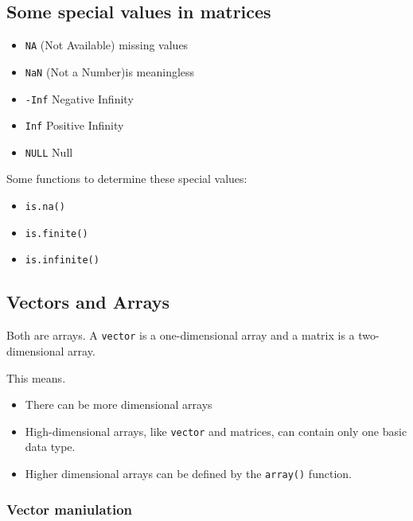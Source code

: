 \documentclass[
]{article}
\begin{document}
\hypertarget{some-special-values-in-matrices}{%
\subsection{Some special values in
matrices}\label{some-special-values-in-matrices}}

\begin{itemize}
\item
  \texttt{NA} (Not Available) missing values
\item
  \texttt{NaN} (Not a Number)is meaningless
\item
  \texttt{-Inf} Negative Infinity
\item
  \texttt{Inf} Positive Infinity
\item
  \texttt{NULL} Null
\end{itemize}

Some functions to determine these special values:

\begin{itemize}
\item
  \texttt{is.na()}
\item
  \texttt{is.finite()}
\item
  \texttt{is.infinite()}
\end{itemize}

\hypertarget{vectors-and-arrays}{%
\subsection{Vectors and Arrays}\label{vectors-and-arrays}}

Both are arrays. A \texttt{vector} is a one-dimensional array and a
matrix is a two-dimensional array.

This means.

\begin{itemize}
\item
  There can be more dimensional arrays
\item
  High-dimensional arrays, like \texttt{vector} and matrices, can
  contain only one basic data type.
\item
  Higher dimensional arrays can be defined by the \texttt{array()}
  function.
\end{itemize}

\hypertarget{vector-maniulation}{%
\subsubsection{Vector maniulation}\label{vector-maniulation}}
\end{document}
